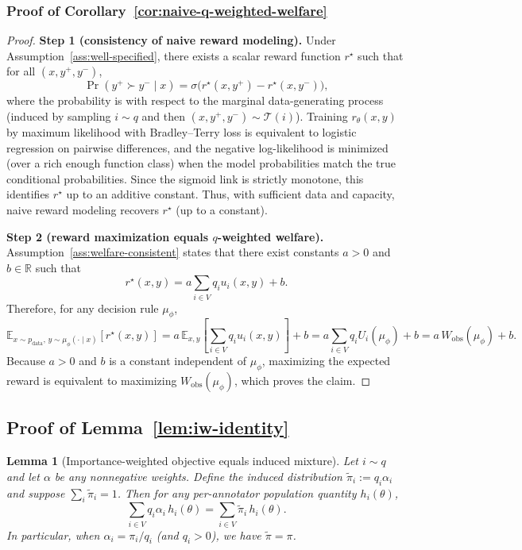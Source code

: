 \documentclass{article}
\newtheorem*{lemma*}{Lemma}
\theoremstyle{plain}
\theoremstyle{definition}
\theoremstyle{remark}
\begin{document}
\subsubsection{Proof of Corollary~\ref{cor:naive-q-weighted-welfare}}
\begin{proof}
\textbf{Step 1 (consistency of naive reward modeling).}
Under Assumption~\ref{ass:well-specified}, there exists a scalar reward function
$r^\star$ such that for all $(x,y^+,y^-)$,
\[
\Pr(y^+ \succ y^- \mid x)
=
\sigma\big(r^\star(x,y^+)-r^\star(x,y^-)\big),
\]
where the probability is with respect to the marginal data-generating process
(induced by sampling $i\sim q$ and then $(x,y^+,y^-)\sim\mathcal{T}(i)$).
Training $r_\theta(x,y)$ by maximum likelihood with Bradley--Terry loss is
equivalent to logistic regression on pairwise differences, and the negative
log-likelihood is minimized (over a rich enough function class) when the model
probabilities match the true conditional probabilities. Since the sigmoid link is
strictly monotone, this identifies $r^\star$ up to an additive constant. Thus,
with sufficient data and capacity, naive reward modeling recovers $r^\star$ (up to a constant).

\textbf{Step 2 (reward maximization equals $q$-weighted welfare).}
Assumption~\ref{ass:welfare-consistent} states that there exist constants
$a > 0$ and $b \in \mathbb{R}$ such that
\[
r^\star(x,y) = a \sum_{i\in V} q_i u_i(x,y) + b.
\]
Therefore, for any decision rule $\mu_\phi$,
\[
\mathbb{E}_{x\sim p_{\mathrm{data}},\,y\sim\mu_\phi(\cdot\mid x)}[r^\star(x,y)]
=
a \, \mathbb{E}_{x,y}\left[\sum_{i\in V} q_i u_i(x,y)\right] + b
=
a \sum_{i\in V} q_i U_i(\mu_\phi) + b
=
a \, W_{\mathrm{obs}}(\mu_\phi) + b.
\]
Because $a > 0$ and $b$ is a constant independent of $\mu_\phi$, maximizing
the expected reward is equivalent to maximizing $W_{\mathrm{obs}}(\mu_\phi)$,
which proves the claim.
\end{proof}

\subsection{Proof of Lemma~\ref{lem:iw-identity}}
\label{app:proof-iw}

\begin{lemma*}[Importance-weighted objective equals induced mixture]
Let $i \sim q$ and let $\alpha$ be any nonnegative weights. Define the
induced distribution $\tilde\pi_i := q_i \alpha_i$ and suppose
$\sum_i \tilde\pi_i = 1$. Then for any per-annotator population quantity
$h_i(\theta)$,
\begin{equation}
    \sum_{i \in V} q_i \alpha_i \, h_i(\theta)
    =
    \sum_{i \in V} \tilde\pi_i \, h_i(\theta).
\end{equation}
In particular, when $\alpha_i = \pi_i / q_i$ (and $q_i > 0$), we have
$\tilde\pi = \pi$.
\end{lemma*}
\end{document}
